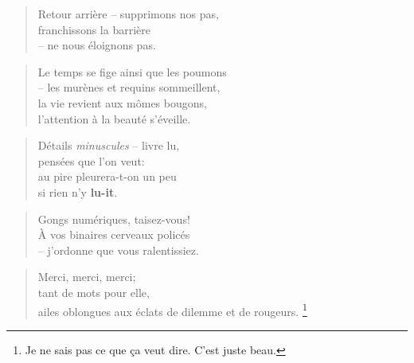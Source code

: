  \begin{verse}
    Retour arrière
    -- supprimons nos pas,\\
    franchissons la barrière\\
    -- ne nous éloignons pas.
  \end{verse}
  \begin{verse}
    Le temps se fige ainsi que les poumons\\
    -- les murènes et requins sommeillent,\\
    la vie revient aux mômes bougons,\\
    l’attention à la beauté s’éveille.
  \end{verse}
  \begin{verse}
    Détails {\small \emph{minuscules}} -- livre lu,\\
    pensées que l’on veut:\\
    au pire pleurera-t-on un peu\\
    si rien n’y \textbf{lu-it}.
  \end{verse}
  \begin{verse}
    Gongs numériques, taisez-vous!\\
    À vos binaires cerveaux policés\\
    -- j’ordonne que vous ralentissiez.
  \end{verse}
  \begin{verse}
    Merci, merci, merci;\\
    tant de mots pour elle,\\
    ailes oblongues aux éclats de dilemme et de rougeurs.
    \footnote{Je ne sais pas ce que ça veut dire. C’est juste beau.}
  \end{verse}
